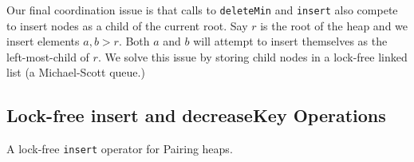 \documentclass{acm_proc_article-sp}
\begin{document}
Our final coordination issue is that calls to \texttt{deleteMin} and \texttt{insert}
also compete to insert nodes as a child of the current root. Say $r$ is the root
of the heap and we insert elements $a,b > r$. Both $a$ and $b$ will attempt
to insert themselves as the left-most-child of $r$. We solve this issue by storing
child nodes in a lock-free linked list (a Michael-Scott \cite{michael96} queue.)

\subsection{Lock-free insert and decreaseKey Operations}
\label{sec:ph:ops}

\begin{algorithm}
\caption{A lock-free \texttt{insert} operator for Pairing heaps.}
\label{alg:insert}
\end{algorithm}
\end{document}
